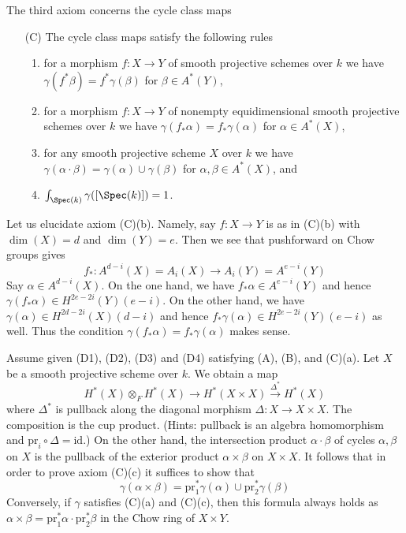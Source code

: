\noindent
The third axiom concerns the cycle class maps
\begin{enumerate}
\item[(C)] The cycle class maps satisfy the following rules
\begin{enumerate}
\item for a morphism $f : X \to Y$ of smooth projective schemes over
$k$ we have $\gamma(f^*\beta) = f^*\gamma(\beta)$ for $\beta \in A^*(Y)$,
\item for a morphism $f : X \to Y$ of nonempty
equidimensional smooth projective schemes over $k$ we have
$\gamma(f_*\alpha) = f_*\gamma(\alpha)$ for $\alpha \in A^*(X)$,
\item for any smooth projective scheme $X$ over $k$ we have
$\gamma(\alpha \cdot \beta) = \gamma(\alpha) \cup \gamma(\beta)$
for $\alpha, \beta \in A^*(X)$, and
\item $\int_{\Spec(k)} \gamma([\Spec(k)]) = 1$.
\end{enumerate}
\end{enumerate}
Let us elucidate axiom (C)(b). Namely, say $f : X \to Y$ is
as in (C)(b) with $\dim(X) = d$ and $\dim(Y) = e$. Then we
see that pushforward on Chow groups gives
$$
f_* : A^{d - i}(X) = A_i(X) \to A_i(Y) = A^{e - i}(Y)
$$
Say $\alpha \in A^{d - i}(X)$. On the one hand, we have
$f_*\alpha \in A^{e - i}(Y)$ and hence
$\gamma(f_*\alpha) \in H^{2e - 2i}(Y)(e - i)$.
On the other hand, we have
$\gamma(\alpha) \in H^{2d - 2i}(X)(d - i)$ and hence
$f_*\gamma(\alpha) \in H^{2e - 2i}(Y)(e - i)$ as well.
Thus the condition $\gamma(f_*\alpha) = f_*\gamma(\alpha)$ makes sense.

\begin{remark}
\label{remark-replace-cup-product}
Assume given (D1), (D2), (D3) and (D4) satisfying (A), (B), and (C)(a).
Let $X$ be a smooth projective scheme over $k$. We obtain a map
$$
H^*(X) \otimes_F H^*(X) \longrightarrow H^*(X \times X)
\xrightarrow{\Delta^*} H^*(X)
$$
where $\Delta^*$ is pullback along the diagonal morphism
$\Delta : X \to X \times X$. The composition is the cup product.
(Hints: pullback is an algebra homomorphism and
$\text{pr}_i \circ \Delta = \text{id}$.)
On the other hand, the intersection product
$\alpha \cdot \beta$ of cycles $\alpha, \beta$ on $X$ is the
pullback of the exterior product $\alpha \times \beta$ on $X \times X$.
It follows that in order to prove axiom (C)(c) it suffices to show that
$$
\gamma(\alpha \times \beta) =
\text{pr}_1^*\gamma(\alpha) \cup \text{pr}_2^*\gamma(\beta)
$$
Conversely, if $\gamma$ satisfies (C)(a) and (C)(c), then this
formula always holds as
$\alpha \times \beta = \text{pr}_1^*\alpha \cdot \text{pr}_2^*\beta$
in the Chow ring of $X \times Y$.
\end{remark}

